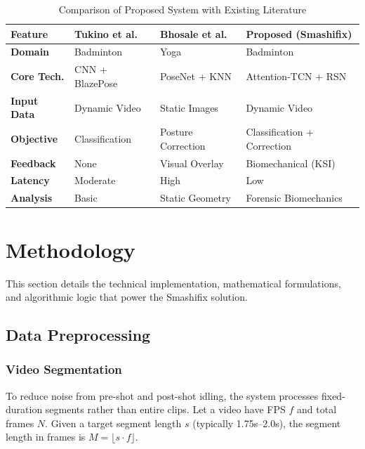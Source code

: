 \documentclass[pdflatex,sn-mathphys-num]{sn-jnl}
\theoremstyle{thmstyleone}%
\theoremstyle{thmstyletwo}%
\theoremstyle{thmstylethree}%
\begin{document}
\begin{table}[h!]
\caption{Comparison of Proposed System with Existing Literature}\label{tab_lit_compare}
\centering
\small
\setlength{\tabcolsep}{4pt}
\renewcommand{\arraystretch}{1.2}
\begin{tabular}{|l|l|l|l|}
\hline
\textbf{Feature} & \textbf{Tukino et al. \cite{b17}} & \textbf{Bhosale et al. \cite{b32}} & \textbf{Proposed (Smashifix)} \\
\hline
\textbf{Domain} & Badminton & Yoga & Badminton \\
\hline
\textbf{Core Tech.} & CNN + BlazePose & PoseNet + KNN & Attention-TCN + RSN \\
\hline
\textbf{Input Data} & Dynamic Video & Static Images & Dynamic Video \\
\hline
\textbf{Objective} & Classification & Posture Correction & Classification + Correction \\
\hline
\textbf{Feedback} & None & Visual Overlay & Biomechanical (KSI) \\
\hline
\textbf{Latency} & Moderate & High & Low \\
\hline
\textbf{Analysis} & Basic & Static Geometry & Forensic Biomechanics \\
\hline
\end{tabular}
\end{table}
\clearpage


\section{Methodology}\label{sec4}

This section details the technical implementation, mathematical formulations, and algorithmic logic that power the Smashifix solution.

\subsection{Data Preprocessing}

\subsubsection{Video Segmentation}
To reduce noise from pre-shot and post-shot idling, the system processes fixed-duration segments rather than entire clips. Let a video have FPS $f$ and total frames $N$. Given a target segment length $s$ (typically 1.75s--2.0s), the segment length in frames is $M = \lfloor s \cdot f \rfloor$.
\end{document}

